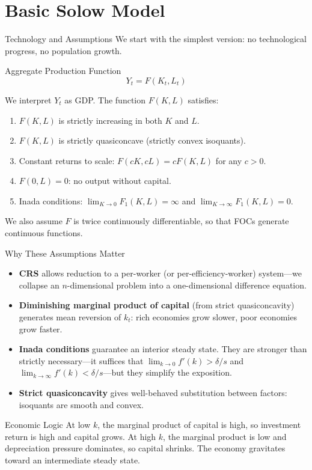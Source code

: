 \documentclass[aspectratio=169,10pt]{beamer}
\begin{document}
\section{Basic Solow Model}

\begin{frame}{Technology and Assumptions}
We start with the simplest version: no technological progress, no population growth.

\begin{block}{Aggregate Production Function}
\[
Y_t = F(K_t,L_t)
\]
\end{block}
We interpret $Y_t$ as GDP. The function $F(K,L)$ satisfies:
\begin{enumerate}
  \item $F(K,L)$ is strictly increasing in both $K$ and $L$.
  \item $F(K,L)$ is strictly quasiconcave (strictly convex isoquants).
  \item Constant returns to scale: $F(cK,cL) = cF(K,L)$ for any $c>0$.
  \item $F(0,L)=0$: no output without capital.
  \item Inada conditions: $\lim_{K\to 0} F_1(K,L) = \infty$ and $\lim_{K\to \infty} F_1(K,L) = 0$.
\end{enumerate}
We also assume $F$ is twice continuously differentiable, so that FOCs generate continuous functions.
\end{frame}

\begin{frame}{Why These Assumptions Matter}
\begin{itemize}
  \item \textbf{CRS} allows reduction to a per-worker (or per-efficiency-worker) system---we collapse an $n$-dimensional problem into a one-dimensional difference equation.
  \item \textbf{Diminishing marginal product of capital} (from strict quasiconcavity) generates mean reversion of $k_t$: rich economies grow slower, poor economies grow faster.
  \item \textbf{Inada conditions} guarantee an interior steady state. They are stronger than strictly necessary---it suffices that $\lim_{k\to 0} f'(k) > \delta/s$ and $\lim_{k\to\infty} f'(k) < \delta/s$---but they simplify the exposition.
  \item \textbf{Strict quasiconcavity} gives well-behaved substitution between factors: isoquants are smooth and convex.
\end{itemize}
\begin{block}{Economic Logic}
At low $k$, the marginal product of capital is high, so investment return is high and capital grows. At high $k$, the marginal product is low and depreciation pressure dominates, so capital shrinks. The economy gravitates toward an intermediate steady state.
\end{block}
\end{frame}
\end{document}
